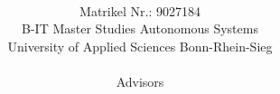 \title{\PaperTitle\\\PaperSubject}
\author{\\
Matrikel Nr.: 9027184 \vspace{0.5cm} \\ 
B-IT Master Studies Autonomous Systems \vspace{0.5cm} \\
University of Applied Sciences Bonn-Rhein-Sieg\\
\vspace{0.7cm} \\ \setcounter{footnote}{6}
Advisors \\
 \\
 \\
 \\
}
\date{\PaperDate}
\maketitle
